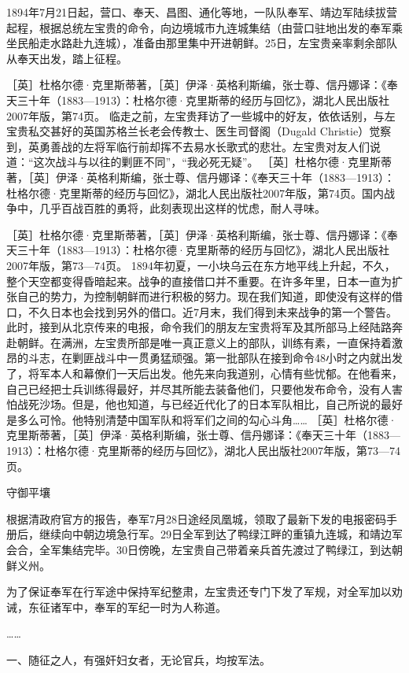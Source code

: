 \documentclass[12pt,UTF8]{ctexbook}
\begin{document}
1894年7月21日起，营口、奉天、昌图、通化等地，一队队奉军、靖边军陆续拔营起程，根据总统左宝贵的命令，向边境城市九连城集结（由营口驻地出发的奉军乘坐民船走水路赴九连城），准备由那里集中开进朝鲜。25日，左宝贵亲率剩余部队从奉天出发，踏上征程。

［英］杜格尔德·克里斯蒂著，［英］伊泽·英格利斯编，张士尊、信丹娜译：《奉天三十年（1883—1913）：杜格尔德·克里斯蒂的经历与回忆》，湖北人民出版社2007年版，第74页。
临走之前，左宝贵拜访了一些城中的好友，依依话别，与左宝贵私交甚好的英国苏格兰长老会传教士、医生司督阁（Dugald Christie）觉察到，英勇善战的左将军临行前却挥不去易水长歌式的悲壮。左宝贵对友人们说道：“这次战斗与以往的剿匪不同”，“我必死无疑”。 ［英］杜格尔德·克里斯蒂著，［英］伊泽·英格利斯编，张士尊、信丹娜译：《奉天三十年（1883—1913）：杜格尔德·克里斯蒂的经历与回忆》，湖北人民出版社2007年版，第74页。国内战争中，几乎百战百胜的勇将，此刻表现出这样的忧虑，耐人寻味。

［英］杜格尔德·克里斯蒂著，［英］伊泽·英格利斯编，张士尊、信丹娜译：《奉天三十年（1883—1913）：杜格尔德·克里斯蒂的经历与回忆》，湖北人民出版社2007年版，第73—74页。
1894年初夏，一小块乌云在东方地平线上升起，不久，整个天空都变得昏暗起来。战争的直接借口并不重要。在许多年里，日本一直为扩张自己的势力，为控制朝鲜而进行积极的努力。现在我们知道，即使没有这样的借口，不久日本也会找到另外的借口。近7月末，我们得到未来战争的第一个警告。此时，接到从北京传来的电报，命令我们的朋友左宝贵将军及其所部马上经陆路奔赴朝鲜。在满洲，左宝贵所部是唯一真正意义上的部队，训练有素，一直保持着激昂的斗志，在剿匪战斗中一贯勇猛顽强。第一批部队在接到命令48小时之内就出发了，将军本人和幕僚们一天后出发。他先来向我道别，心情有些忧郁。在他看来，自己已经把士兵训练得最好，并尽其所能去装备他们，只要他发布命令，没有人害怕战死沙场。但是，他也知道，与已经近代化了的日本军队相比，自己所说的最好是多么可怜。他特别清楚中国军队和将军们之间的勾心斗角…… ［英］杜格尔德·克里斯蒂著，［英］伊泽·英格利斯编，张士尊、信丹娜译：《奉天三十年（1883—1913）：杜格尔德·克里斯蒂的经历与回忆》，湖北人民出版社2007年版，第73—74页。

守御平壤

根据清政府官方的报告，奉军7月28日途经凤凰城，领取了最新下发的电报密码手册后，继续向中朝边境急行军。29日全军到达了鸭绿江畔的重镇九连城，和靖边军会合，全军集结完毕。30日傍晚，左宝贵自己带着亲兵首先渡过了鸭绿江，到达朝鲜义州。

为了保证奉军在行军途中保持军纪整肃，左宝贵还专门下发了军规，对全军加以劝诫，东征诸军中，奉军的军纪一时为人称道。

……

一、随征之人，有强奸妇女者，无论官兵，均按军法。
\end{document}
